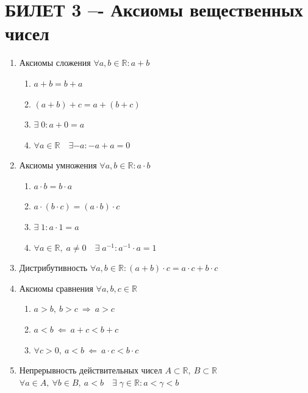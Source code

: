 \documentclass{article}
\newcommand{\R}{\mathbb R}
\begin{document}
\section{БИЛЕТ 3 –- Аксиомы вещественных чисел}
\begin{enumerate}
\item Аксиомы сложения
\newline
$\forall a, b \in \R : a + b$
    \begin{enumerate}\alph*
    \item $a + b = b + a$
    \item $(a + b) + c = a + (b + c)$
    \item $\exists \;  0 : a + 0 = a$
    \item $\forall a \in \R \quad \exists -a : -a + a = 0$
    \end{enumerate}
\item Аксиомы умножения
\newline
$\forall a, b \in \R : a \cdot b$
    \begin{enumerate}\alph*
    \item $a \cdot b = b \cdot a$
    \item $a \cdot (b \cdot c) = (a \cdot b) \cdot c$
    \item $\exists \; 1 : a \cdot 1 = a$
    \item $\forall a \in \R, \;a \ne 0 \quad \exists \; a^{-1} : a^{-1} \cdot a = 1$
    \end{enumerate}
\item Дистрибутивность
\newline
$\forall a,b \in \R : (a + b) \cdot c = a \cdot c + b \cdot c$
\item Аксиомы сравнения
\newline
$\forall a,b,c \in \R$
    \begin{enumerate}\alph*
    \item $a > b, \: b > c \: \Rightarrow \: a > c$
    \item $a<b \: \Leftarrow \: a+c<b+c$
    \item $\forall c >0, \: a<b \: \Leftarrow \: a \cdot c < b \cdot c$
    \end{enumerate}
\item Непрерывность действительных чисел
\newline
$A \subset \R, \: B\subset \R$
\newline
$\forall a \in A, \:\forall b \in B, \: a<b \quad \exists \;\gamma \in \R: a<\gamma<b$
\end{enumerate}
\newpage
\end{document}
